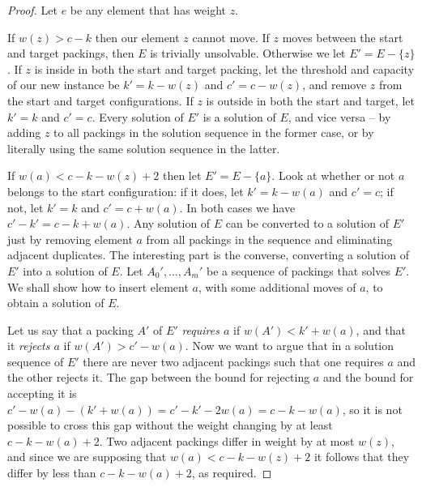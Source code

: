 \documentclass{robinminion}
\begin{document}
\begin{proof}
    Let $e$ be any element that has weight $z$.
    
    If $w(z) > c - k$ then our element $z$ cannot move. If $z$ moves between the start and target packings, then $E$ is trivially unsolvable. Otherwise we let $E' = E-\{z\}$. If $z$ is inside in both the start and target packing, let the threshold and capacity of our new instance be $k' = k-w(z)$ and $c' = c-w(z)$, and remove $z$ from the start and target configurations. If $z$ is outside in both the start and target, let $k'=k$ and $c'=c$. Every solution of $E'$ is a solution of $E$, and vice versa -- by adding $z$ to all packings in the solution sequence in the former case, or by literally using the same solution sequence in the latter.
    
    If $w(a) < c-k-w(z) + 2$ then let $E' = E-\{a\}$. Look at whether or not $a$ belongs to the start configuration: if it does, let $k'=k-w(a)$ and $c'=c$; if not, let $k'=k$ and $c'=c+w(a)$. In both cases we have $c'-k' = c-k+w(a)$. Any solution of $E$ can be converted to a solution of $E'$ just by removing element $a$ from all packings in the sequence and eliminating adjacent duplicates. The interesting part is the converse, converting a solution of $E'$ into a solution of $E$. Let $A_0', \dots, A_m'$ be a sequence of packings that solves $E'$. We shall show how to insert element $a$, with some additional moves of $a$, to obtain a solution of $E$.
    
    Let us say that a packing $A'$ of $E'$ \textit{requires $a$} if $w(A') < k' + w(a)$, and that it \textit{rejects $a$} if $w(A') > c' - w(a)$. Now we want to argue that in a solution sequence of $E'$ there are never two adjacent packings such that one requires $a$ and the other rejects it. The gap between the bound for rejecting $a$ and the bound for accepting it is $c' - w(a) - (k' + w(a)) = c'-k'-2w(a) = c-k-w(a)$, so it is not possible to cross this gap without the weight changing by at least $c-k-w(a)+2$. Two adjacent packings differ in weight by at most $w(z)$, and since we are supposing that $w(a) < c-k-w(z) + 2$ it follows that they differ by less than $c-k-w(a)+2$, as required.
    

\end{proof}
\end{document}
